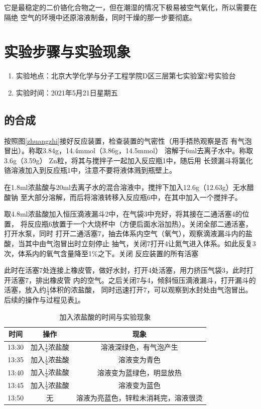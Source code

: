 \documentclass[a4paper,zihao=5,UTF8]{ctexart}
\begin{document}
        \par 
        它是最稳定的二价铬化合物之一，但在潮湿的情况下极易被空气氧化，所以需要在隔绝
        空气的环境中还原溶液制备，同时干燥的那一步要彻底。
        \section{实验步骤与实验现象}
        \begin{enumerate}
            \item 实验地点：北京大学化学与分子工程学院D区三层第七实验室2号实验台
            \item 实验时间：2021年5月21日星期五
        \end{enumerate}
        \subsection{的合成}
        按照图\ref{zhuangzhi}接好反应装置，检查装置的气密性（用手捂热观察是否
        有气泡冒出）。称取3.84g，14.4mmol（3.86g，14.5mmol）
        溶解于6ml去离子水中。称取3.6g（3.59g） Zn粒，将其与搅拌子一起加入反应瓶1中，随后用
        长颈漏斗将氯化铬溶液加入到反应瓶1中，注意不要将液体溅到瓶壁上。
        \par 
        在1.8ml浓盐酸与20ml去离子水的混合溶液中，搅拌下加入12.6g（12.63g）无水醋酸钠
        至大部分溶解，而后将溶液转移入反应瓶6中，在其中加入一个搅拌子。
        \par 
        取4.8ml浓盐酸加入恒压滴液漏斗2中，在气袋3中充好，将其接在二通活塞4的位置，
        将反应瓶6放置于一个大烧杯中（方便后面水浴加热）。关闭全部二通活塞，打开水泵，同时
        打开二通活塞7，抽去体系内空气（氧气），观察滴液漏斗内的盐酸，当其中由气泡冒出时立刻停止
        抽气，关闭7打开4让氮气进入体系。如此反复3次，体系内的氧气含量降至1\%之下。关闭
        反应装置的所有活塞
        \par 
        此时在活塞7处连接上橡皮管，做好水封，打开4处活塞，用力挤压气袋3，此时打开活塞7，排出橡皮管
        内的空气。之后关闭7与4，倾斜恒压滴液漏斗，打开漏斗的活塞，放入约$\frac{1}{4}$体积的浓盐酸，
        同时迅速打开7，可以观察到水封处由气泡冒出。后续的操作与过程见表\ref{xianxiang}。
        \begin{table}[htbp]
            \centering 
            \caption{加入浓盐酸的时间与实验现象}
            \begin{tabular}[htbp]{ccc}
                \toprule
                时间 & 操作 & 现象 \\
                \midrule
                13:30 & 加入$\frac{1}{4}$浓盐酸 & 溶液深绿色，有气泡产生\\
                13:35 & 加入$\frac{1}{4}$浓盐酸 & 溶液变为青色\\
                13:40 & 加入$\frac{1}{4}$浓盐酸 & 溶液变为蓝绿色，明显放热\\
                13:45 & 加入$\frac{1}{4}$浓盐酸 & 溶液变为蓝色\\
                13:50 & 无 & 溶液为亮蓝色，锌粒未消耗完，溶液很烫\\
                \bottomrule
            \end{tabular}
            \label{xianxiang}
        \end{table}
\end{document}
